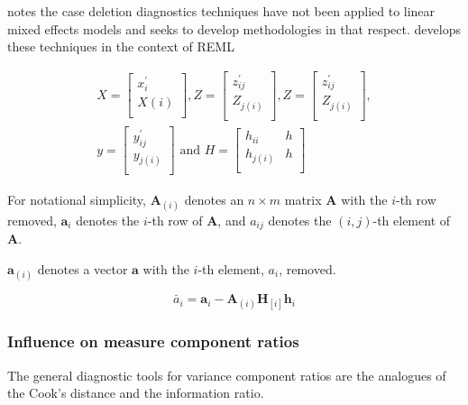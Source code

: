 \documentclass[12pt, a4paper]{report}
\theoremstyle{plain}
\theoremstyle{definition}
\theoremstyle{remark}
\begin{document}
	\citet{Christensen} notes the case deletion diagnostics techniques have not been applied to linear mixed effects models and seeks to develop methodologies in that respect. \citet{Christensen} develops these techniques in the context of REML
	
	
	\begin{eqnarray*}
		X= \left[%
		\begin{array}{c}
			x^\prime_{i} \\
			X(i) \\
		\end{array}%
		\right],
		Z= \left[%
		\begin{array}{c}
			z^\prime_{ij} \\
			Z_{j(i)} \\
		\end{array}%
		\right] ,
		Z = \left[%
		\begin{array}{c}
			z^\prime_{ij} \\
			Z_{j(i)} \\
		\end{array}%
		\right], \\
		y = \left[%
		\begin{array}{c}
			y^\prime_{ij} \\
			y_{j(i)} \\
		\end{array}%
		\right]
		\mbox{ and } H = \left[%
		\begin{array}{cc}
			h_{ii}& h\\
			h_{j(i)} & h\\
		\end{array}%
		\right]
	\end{eqnarray*}
	
	For notational simplicity, $\boldsymbol{A}_{(i)}$ denotes an $n
	\times m$ matrix  $\boldsymbol{A}$ with the $i$-th row removed,
	$\boldsymbol{a}_{i}$ denotes the $i$-th row of $\boldsymbol{A}$,
	and $a_{ij}$ denotes the $(i, j)$-th element of $\boldsymbol{A}$.
	
	$\boldsymbol{a}_{(i)}$ denotes a vector $\boldsymbol{a}$ with the $i$-th element, $a_{i}$, removed.
	
	\begin{equation}
	\breve{a_{i}} =  \boldsymbol{a}_{i} -
	\boldsymbol{A}_{(i)}\boldsymbol{H}_{[i]}\boldsymbol{h}_{i}
	\end{equation}

	\subsubsection{Influence on measure component ratios}               %
	The general diagnostic tools for variance component ratios are the analogues of the Cook's distance and the information ratio.
	
\end{document}
